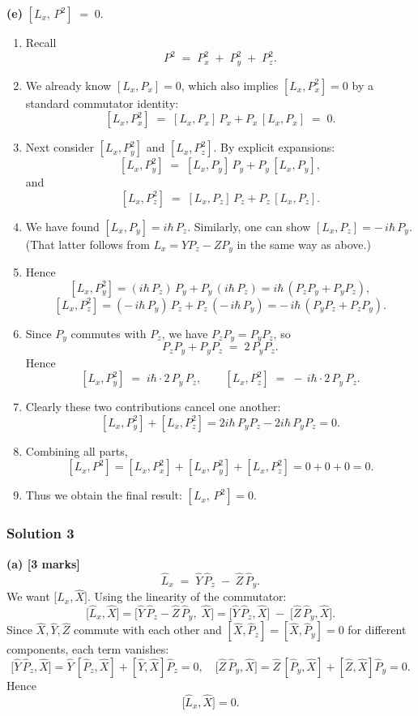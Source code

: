 \documentclass{article}
\begin{document}
\bigskip
\noindent
\textbf{(e)} \; $\displaystyle [L_x,\,P^2] \;=\; 0.$

\begin{enumerate}
\item Recall 
\[
P^2 \;=\; P_x^2 \;+\; P_y^2 \;+\; P_z^2.
\]
\item We already know $[L_x,P_x]=0$, which also implies $[L_x,P_x^2]=0$ by a standard commutator identity:
\[
[L_x,P_x^2] \;=\; [L_x,P_x]\,P_x + P_x\,[L_x,P_x] \;=\; 0.
\]
\item Next consider $[L_x,P_y^2]$ and $[L_x,P_z^2]$.  By explicit expansions:
\[
[L_x,P_y^2] 
\;=\;
[L_x,P_y]\,P_y + P_y\,[L_x,P_y],
\]
and 
\[
[L_x,P_z^2]
\;=\;
[L_x,P_z]\,P_z + P_z\,[L_x,P_z].
\]
\item We have found $[L_x,P_y] = i\hbar\,P_z$.  Similarly, one can show 
\(
[L_x,P_z] = -\,i\hbar\,P_y.
\)
(That latter follows from $L_x = YP_z - ZP_y$ in the same way as above.)
\item Hence
\[
[L_x,P_y^2]
= (i\hbar\,P_z)\,P_y + P_y\,(i\hbar\,P_z)
= i\hbar\,( P_z P_y + P_y P_z ),
\]
\[
[L_x,P_z^2]
= (-\,i\hbar\,P_y)\,P_z + P_z\,(-\,i\hbar\,P_y)
= -\,i\hbar\,( P_y P_z + P_z P_y ).
\]
\item Since $P_y$ commutes with $P_z$, we have $P_z P_y = P_y P_z$, so
\[
P_z P_y + P_y P_z
\;=\;
2\,P_y P_z.
\]
Hence 
\[
[L_x,P_y^2] \;=\; i\hbar\cdot 2\,P_y\,P_z,
\qquad
[L_x,P_z^2] \;=\; -\,i\hbar\cdot 2\,P_y\,P_z.
\]
\item Clearly these two contributions cancel one another:
\[
[L_x,P_y^2] + [L_x,P_z^2]
= 2 i\hbar\,P_y P_z - 2 i\hbar\,P_y P_z
= 0.
\]
\item Combining all parts, 
\[
[L_x,P^2] 
= [L_x,P_x^2] + [L_x,P_y^2] + [L_x,P_z^2]
= 0 + 0 + 0
= 0.
\]
\item Thus we obtain the final result: $[L_x,\,P^2]=0$.
\end{enumerate}

\subsubsection{Solution 3}
\textbf{(a) [3 marks]} 
\[
\hat{L}_x \;=\; \hat{Y}\,\hat{P}_z \;-\; \hat{Z}\,\hat{P}_y.
\]
We want \(\bigl[\hat{L}_x,\hat{X}\bigr]\). Using the linearity of the commutator:
\[
\bigl[\hat{L}_x,\hat{X}\bigr] 
= \bigl[\hat{Y}\,\hat{P}_z - \hat{Z}\,\hat{P}_y,\;\hat{X}\bigr] 
= \bigl[\hat{Y}\,\hat{P}_z,\hat{X}\bigr] \;-\; \bigl[\hat{Z}\,\hat{P}_y,\hat{X}\bigr].
\]
Since \(\hat{X},\hat{Y},\hat{Z}\) commute with each other and \([\hat{X},\hat{P}_z]=[\hat{X},\hat{P}_y]=0\) for different components, each term vanishes:
\[
\bigl[\hat{Y}\,\hat{P}_z,\hat{X}\bigr] = \hat{Y}\,[\hat{P}_z,\hat{X}] + [\hat{Y},\hat{X}]\hat{P}_z = 0,
\quad
\bigl[\hat{Z}\,\hat{P}_y,\hat{X}\bigr] = \hat{Z}\,[\hat{P}_y,\hat{X}] + [\hat{Z},\hat{X}]\hat{P}_y = 0.
\]
Hence 
\[
\bigl[\hat{L}_x,\hat{X}\bigr] = 0.
\]
\end{document}
